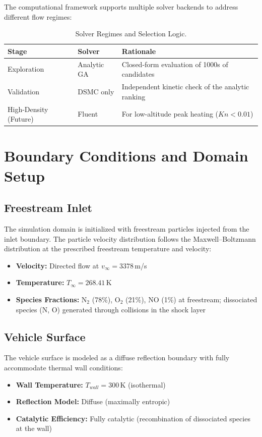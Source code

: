 The computational framework supports multiple solver backends to address different flow regimes:

\begin{table}[H]
    \centering
    \caption{Solver Regimes and Selection Logic.}
    \label{tab:solver_regimes}
    \begin{tabularx}{\textwidth}{|l|>{\RaggedRight\arraybackslash}p{}|>{\RaggedRight\arraybackslash}X|}
        \hline
        \textbf{Stage} & \textbf{Solver} & \textbf{Rationale} \\ \hline
        Exploration & Analytic GA & Closed-form evaluation of 1000s of candidates \\ \hline
        Validation & DSMC only & Independent kinetic check of the analytic ranking \\ \hline
        High-Density (Future) & Fluent & For low-altitude peak heating ($Kn < 0.01$) \\ \hline
    \end{tabularx}
\end{table}

\section{Boundary Conditions and Domain Setup}

\subsection{Freestream Inlet}
The simulation domain is initialized with freestream particles injected from the inlet boundary. The particle velocity distribution follows the Maxwell--Boltzmann distribution at the prescribed freestream temperature and velocity:

\begin{itemize}
    \item \textbf{Velocity:} Directed flow at $v_{\infty} = 3378$\,m/s
    \item \textbf{Temperature:} $T_{\infty} = 268.41$\,K
    \item \textbf{Species Fractions:} N$_2$ (78\%), O$_2$ (21\%), NO (1\%) at freestream; dissociated species (N, O) generated through collisions in the shock layer
\end{itemize}

\subsection{Vehicle Surface}
The vehicle surface is modeled as a diffuse reflection boundary with fully accommodate thermal wall conditions:
\begin{itemize}
    \item \textbf{Wall Temperature:} $T_{wall} = 300$\,K (isothermal)
    \item \textbf{Reflection Model:} Diffuse (maximally entropic)
    \item \textbf{Catalytic Efficiency:} Fully catalytic (recombination of dissociated species at the wall)
\end{itemize}

